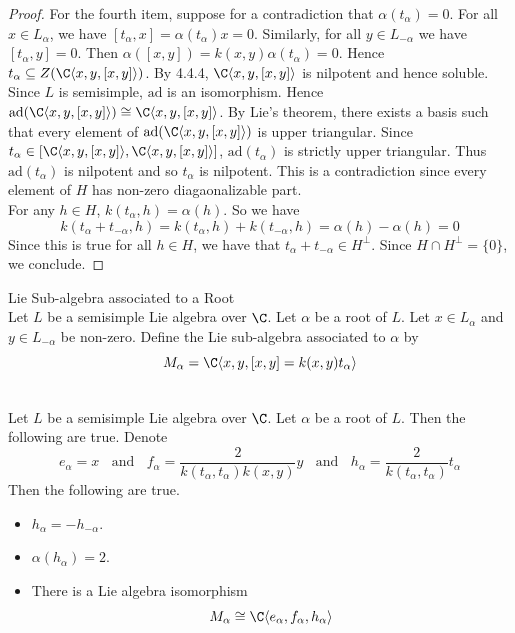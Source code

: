 \documentclass[a4paper]{article}
\begin{document}
\begin{lmm}{}{}
\begin{proof}
For the fourth item, suppose for a contradiction that $\alpha(t_\alpha)=0$. For all $x\in L_\alpha$, we have $[t_\alpha,x]=\alpha(t_\alpha)x=0$. Similarly, for all $y\in L_{-\alpha}$ we have $[t_\alpha,y]=0$. Then $\alpha([x,y])=k(x,y)\alpha(t_\alpha)=0$. Hence $t_\alpha\subseteq Z(\C\langle x,y, [x,y]\rangle)$. By 4.4.4, $\C\langle x,y,[x,y]\rangle$ is nilpotent and hence soluble. Since $L$ is semisimple, $\text{ad}$ is an isomorphism. Hence $\text{ad}(\C\langle x,y,[x,y]\rangle)\cong\C\langle x,y,[x,y]\rangle$. By Lie's theorem, there exists a basis such that every element of $\text{ad}(\C\langle x,y,[x,y]\rangle)$ is upper triangular. Since $t_\alpha\in[\C\langle x,y,[x,y]\rangle,\C\langle x,y,[x,y]\rangle]$, $\text{ad}(t_\alpha)$ is strictly upper triangular. Thus $\text{ad}(t_\alpha)$ is nilpotent and so $t_\alpha$ is nilpotent. This is a contradiction since every element of $H$ has non-zero diagaonalizable part. \\

For any $h\in H$, $k(t_\alpha,h)=\alpha(h)$. So we have $$k(t_\alpha+t_{-\alpha},h)=k(t_\alpha,h)+k(t_{-\alpha},h)=\alpha(h)-\alpha(h)=0$$ Since this is true for all $h\in H$, we have that $t_\alpha+t_{-\alpha}\in H^\perp$. Since $H\cap H^\perp=\{0\}$, we conclude. 
\end{proof}
\end{lmm}

\begin{defn}{Lie Sub-algebra associated to a Root}{} \\Let $L$ be a semisimple Lie algebra over $\C$. Let $\alpha$ be a root of $L$. Let $x\in L_\alpha$ and $y\in L_{-\alpha}$ be non-zero. Define the Lie sub-algebra associated to $\alpha$ by $$M_\alpha=\C\langle x,y,[x,y]=k(x,y)t_\alpha\rangle$$
\end{defn}

\begin{prp}{}{} \\Let $L$ be a semisimple Lie algebra over $\C$. Let $\alpha$ be a root of $L$. Then the following are true. Denote $$e_\alpha=x\;\;\text{ and }\;\;f_\alpha=\frac{2}{k(t_\alpha,t_\alpha)k(x,y)}y\;\;\text{ and }\;\;h_\alpha=\frac{2}{k(t_\alpha,t_\alpha)}t_\alpha$$ Then the following are true. 
\begin{itemize}
\item $h_\alpha=-h_{-\alpha}$. 
\item $\alpha(h_\alpha)=2$. 
\item There is a Lie algebra isomorphism $$M_\alpha\cong\C\langle e_\alpha,f_\alpha,h_\alpha\rangle$$
\end{itemize}
\end{prp}
\end{document}
